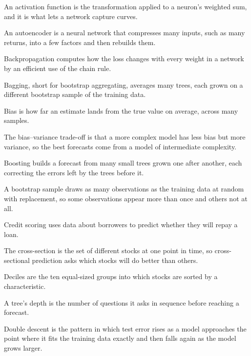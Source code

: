 \begin{keyterms}
\footnotesize
\begin{description}[leftmargin=0pt, itemsep=0pt, parsep=0pt, topsep=0pt, font=\normalfont\bfseries\color{FEMaroon}]
  \item[Activation function.] An activation function is the transformation applied to a neuron's weighted sum, and it is what lets a network capture curves.
  \item[Autoencoder.] An autoencoder is a neural network that compresses many inputs, such as many returns, into a few factors and then rebuilds them.
  \item[Backpropagation.] Backpropagation computes how the loss changes with every weight in a network by an efficient use of the chain rule.
  \item[Bagging.] Bagging, short for bootstrap aggregating, averages many trees, each grown on a different bootstrap sample of the training data.
  \item[Bias (of an estimator).] Bias is how far an estimate lands from the true value on average, across many samples.
  \item[Bias--variance trade-off.] The bias--variance trade-off is that a more complex model has less bias but more variance, so the best forecasts come from a model of intermediate complexity.
  \item[Boosting.] Boosting builds a forecast from many small trees grown one after another, each correcting the errors left by the trees before it.
  \item[Bootstrap sample.] A bootstrap sample draws as many observations as the training data at random with replacement, so some observations appear more than once and others not at all.
  \item[Credit scoring.] Credit scoring uses data about borrowers to predict whether they will repay a loan.
  \item[Cross-section.] The cross-section is the set of different stocks at one point in time, so cross-sectional prediction asks which stocks will do better than others.
  \item[Deciles.] Deciles are the ten equal-sized groups into which stocks are sorted by a characteristic.
  \item[Depth (of a tree).] A tree's depth is the number of questions it asks in sequence before reaching a forecast.
  \item[Double descent.] Double descent is the pattern in which test error rises as a model approaches the point where it fits the training data exactly and then falls again as the model grows larger.

\end{description}
\end{keyterms}
